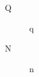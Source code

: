 \documentclass{amsart}
\begin{document}
\begin{description}
\item[\quad Q] q
\item[N] n
\end{description}
\end{document}
